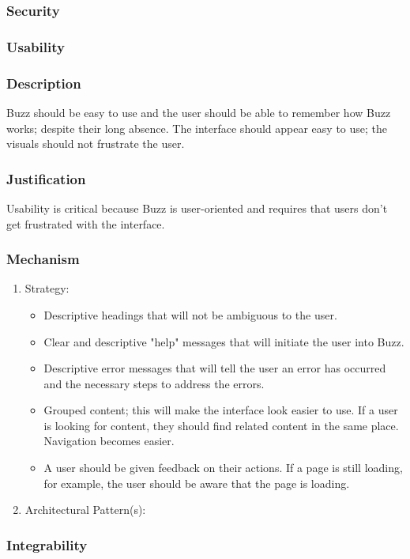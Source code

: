 \documentclass[a4paper,12pt,titlepage]{article}
\begin{document}
\subsubsection{Security}%
	
\subsubsection{Usability}%
	\subsubsection*{Description}
	Buzz should be easy to use and the user should be able to remember how Buzz works; despite their long absence. The interface should appear easy to use; the visuals should not frustrate the user.
	\subsubsection*{Justification}
	Usability is critical because Buzz is user-oriented and requires that users don't get frustrated with the interface. 
	\subsubsection*{Mechanism}
	\begin{enumerate}
		\item Strategy:
		\begin{itemize}
			\item Descriptive headings that will not be ambiguous to the user.
			\item Clear and descriptive "help" messages that will initiate the user into Buzz. 
			\item Descriptive error messages that will tell the user an error has occurred and the necessary steps to address the errors.
			\item Grouped content; this will make the interface look easier to use. If a user is looking for content, they should find related content in the same place. Navigation becomes easier.
			\item A user should be given feedback on their actions. If a page is still loading, for example, the user should be aware that the page is loading.
		\end{itemize} 
		\item Architectural Pattern(s):
	\end{enumerate}
\newpage
\subsubsection{Integrability}%
	
\newpage
\end{document}
